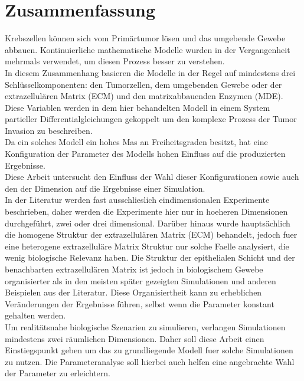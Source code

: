 \section*{Zusammenfassung}

Krebszellen können sich vom Primärtumor lösen und das umgebende Gewebe abbauen. 
Kontinuierliche mathematische Modelle wurden in der Vergangenheit mehrmals verwendet, um diesen Prozess besser zu verstehen.\\
In diesem Zusammenhang basieren die Modelle in der Regel auf mindestens drei Schlüsselkomponenten: den Tumorzellen, dem umgebenden Gewebe oder der extrazellulären Matrix (ECM) und den matrixabbauenden Enzymen (MDE). Diese Variablen werden in dem hier behandelten Modell in einem System partieller Differentialgleichungen gekoppelt um den komplexe Prozess der Tumor Invasion zu beschreiben.\\
Da ein solches Modell ein hohes Mas an Freiheitsgraden besitzt, hat eine Konfiguration der Parameter des Modells hohen Einfluss auf die produzierten Ergebnisse.\\
Diese Arbeit untersucht den Einfluss der Wahl dieser Konfigurationen sowie auch den der Dimension auf die Ergebnisse einer Simulation.\\ 
In der Literatur werden fast ausschlieslich eindimensionalen Experimente beschrieben, daher werden die Experimente hier nur in hoeheren Dimensionen durchgeführt, zwei oder drei dimensional. Darüber hinaus wurde hauptsächlich die homogene Struktur der extrazellulären Matrix (ECM) behandelt, jedoch fuer eine heterogene extrazelluläre Matrix Struktur nur solche Faelle analysiert, die wenig biologische Relevanz haben. Die Struktur der epithelialen Schicht und der benachbarten extrazellulären Matrix ist jedoch in biologischem Gewebe organisierter als in den meisten später gezeigten Simulationen und anderen Beispielen aus der Literatur. Diese Organisiertheit kann zu erheblichen Veränderungen der Ergebnisse führen, selbst wenn die Parameter konstant gehalten werden.\\
Um realitätsnahe biologische Szenarien zu simulieren, verlangen Simulationen mindestens zwei räumlichen Dimensionen. Daher soll diese Arbeit einen Einstiegspunkt geben um das zu grundliegende Modell fuer solche Simulationen zu nutzen. Die Parameteranalyse soll hierbei auch helfen eine angebrachte Wahl der Parameter zu erleichtern.

